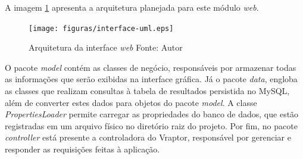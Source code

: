 A imagem \ref{interface-uml} apresenta a arquitetura planejada para este módulo \textit{web}.

\begin{figure}[ht!]
	\centering
	\texttt{[image: figuras/interface-uml.eps]}
	\caption[Arquitetura da interface \textit{web}]{Arquitetura da interface \textit{web}
	\protect\linebreak Fonte: Autor}
	\label{interface-uml}
\end{figure}
\FloatBarrier

O pacote \textit{model} contém as classes de negócio, responsáveis por armazenar todas as informações que serão exibidas na interface gráfica. Já o pacote \textit{data}, engloba as classes que realizam consultas à tabela de resultados persistida no MySQL, além de converter estes dados para objetos do pacote \textit{model}. A classe \textit{PropertiesLoader} permite carregar as propriedades do banco de dados, que estão registradas em um arquivo físico no diretório raiz do projeto. Por fim, no pacote \textit{controller} está presente a controladora do Vraptor, responsável por gerenciar e responder as requisições feitas à aplicação.


